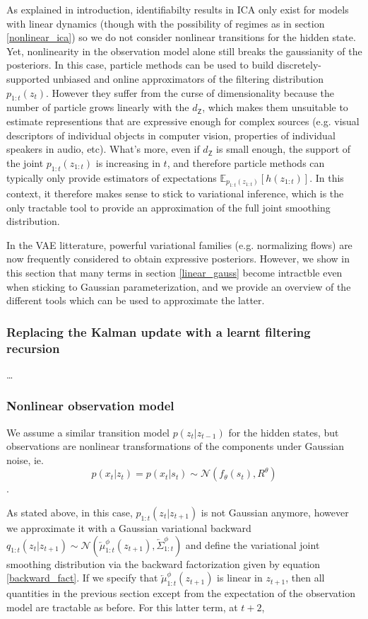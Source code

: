 \documentclass{article}
\newcommand{\1}{\mathbbm{1}}
\newcommand{\expect}[2]{\mathbb{E}_{#1}\left[#2\right]}
\newcommand{\gaussian}[2]{\mathcal{N}\left( #1, #2 \right)}
\newcommand{\backward}[1]{\overleftarrow{#1}}
\newcommand{\vbackward}[1]{q_{1:#1}(z_{#1}|z_{#1 + 1})}
\newcommand{\vbackwardparam}[2]{\backward{#1}_{1:#2}^\phi}
\newcommand{\vbackwardmean}[1]{\vbackwardparam{\mu}{#1}}
\newcommand{\vbackwardcov}[1]{\vbackwardparam{\Sigma}{#1}}
\begin{document}
As explained in introduction, identifiabilty results in ICA only exist for models with linear dynamics (though with the possibility of regimes as in section \ref{nonlinear_ica}) so we do not consider nonlinear transitions for the hidden state. Yet, nonlinearity in the observation model alone still breaks the gaussianity of the posteriors. In this case, particle methods can be used to build discretely-supported unbiased and online approximators of the filtering distribution $p_{1:t}(z_t)$. However they suffer from the curse of dimensionality because the number of particle grows linearly with the $d_{\mathsf{Z}}$, which makes them unsuitable to estimate representions that are expressive enough for complex sources (e.g. visual descriptors of individual objects in computer vision, properties of individual speakers in audio, etc). What's more, even if $d_{\mathsf{Z}}$ is small enough, the support of the joint $p_{1:t}(z_{1:t})$ is increasing in $t$, and therefore particle methods can typically only provide estimators of expectations $\expect{p_{1:t}(z_{1:t})}{h(z_{1:t})}$. In this context, it therefore makes sense to stick to variational inference, which is the only tractable tool to provide an approximation of the full joint smoothing distribution. 

In the VAE litterature, powerful variational families (e.g. normalizing flows) are now frequently considered to obtain expressive posteriors. However, we show in this section that many terms in section \ref{linear_gauss} become intractble even when sticking to Gaussian parameterization, and we provide an overview of the different tools which can be used to approximate the latter. 

\subsubsection*{Replacing the Kalman update with a learnt filtering recursion}
\dots

\subsubsection*{Nonlinear observation model}

We assume a similar transition model $p(z_t|z_{t-1})$ for the hidden states, but observations are nonlinear transformations of the components under Gaussian noise, ie. $$p(x_t|z_t) = p(x_t|s_t) \sim \gaussian{f_\theta(s_t)}{R^\theta}$$. 

As stated above, in this case, $p_{1:t}(z_t|z_{t+1})$ is not Gaussian anymore, however we approximate it with a Gaussian variational backward $\vbackward{t} \sim \gaussian{\vbackwardmean{t}(z_{t+1})}{\vbackwardcov{t}}$ and define the variational joint smoothing distribution via the backward factorization given by equation \ref{backward_fact}. If we specify that $\vbackwardmean{t}(z_{t+1})$ is linear in $z_{t+1}$, then all quantities in the previous section except from the expectation of the observation model are tractable as before. For this latter term, at $t+2$, 
\end{document}
